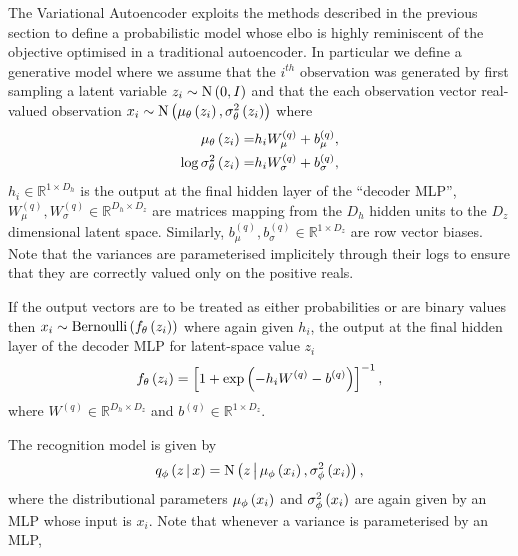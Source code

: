 \documentclass[../report.tex]{subfiles}
\begin{document}
The Variational Autoencoder exploits the methods described in the previous section to define a probabilistic model whose elbo is highly reminiscent of the objective optimised in a traditional autoencoder. In particular we define a generative model where we assume that the $i^{th}$ observation was generated by first sampling a latent variable $z_i \sim \textrm{N} \left( 0, I\right)$ and that the each observation vector real-valued observation $x_i \sim \textrm{N} \left( \mu_\theta \left( z_i\right), \sigma^2_\theta \left( z_i\right)\right)$ where
\begin{align}
  \mu_\theta \left( z_i\right) =& h_i W_\mu^{(q)} + b_\mu^{(q)}, \\
  \log \sigma^2_\theta \left( z_i\right) =& h_i W_\sigma^{(q)} + b_\sigma^{(q)},
\end{align}
$h_i \in \mathbb{R}^{1 \times D_h}$ is the output at the final hidden layer of the ``decoder MLP'', $W_\mu^{(q)}, W_\sigma^{(q)} \in \mathbb{R}^{D_h \times D_z}$ are matrices mapping from the $D_h$ hidden units to the $D_z$ dimensional latent space. Similarly, $b_\mu^{(q)}, b_\sigma^{(q)} \in \mathbb{R}^{1 \times D_z}$ are row vector biases. Note that the variances are parameterised implicitely through their logs to ensure that they are correctly valued only on the positive reals.

If the output vectors are to be treated as either probabilities or are binary values then $x_i \sim \textrm{Bernoulli} \left( f_\theta \left( z_i\right)\right)$ where again given $h_i$, the output at the final hidden layer of the decoder MLP for latent-space value $z_i$
\begin{equation}
  f_\theta \left( z_i\right) = \left[1 + \exp \left( - h_i W^{(q)} - b^{(q)}\right) \right]^{-1},
\end{equation}
where $W^{(q)} \in \mathbb{R}^{D_h \times D_z}$ and $b^{(q)} \in \mathbb{R}^{1 \times D_z}$.








The recognition model is given by
\begin{equation}
  q_\phi \left(z \, \middle\vert \, x \right) = \textrm{N} \left(z \, \middle\vert \, \mu_\phi \left( x_i\right), \sigma_\phi^2 \left( x_i\right) \right),
\end{equation}
where the distributional parameters $\mu_\phi \left( x_i\right)$ and $\sigma_\phi^2 \left( x_i\right)$ are again given by an MLP whose input is $x_i$. Note that whenever a variance is parameterised by an MLP, 
\end{document}
